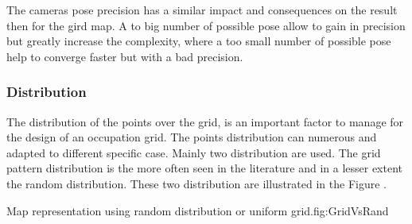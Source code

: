 The cameras pose precision has a similar impact and consequences on the result then  for the gird map.
A to big  number of possible pose allow to gain in precision but greatly increase the complexity, where a too small  number of possible pose help to converge faster but with a bad precision. 
\subsubsection{Distribution}
The distribution of the points over the grid, is an important factor to manage for the design of an occupation grid.%
The points distribution can numerous and adapted to different specific case. Mainly two distribution are used. The grid pattern distribution is the more often seen in the literature and in a lesser extent the random distribution. These two distribution  are illustrated in the Figure .

\begin{mfigures}[!]
{Map representation using random distribution or uniform grid.}{fig:GridVsRand} \centering
{}
\hspace{1cm}
\end{mfigures}

